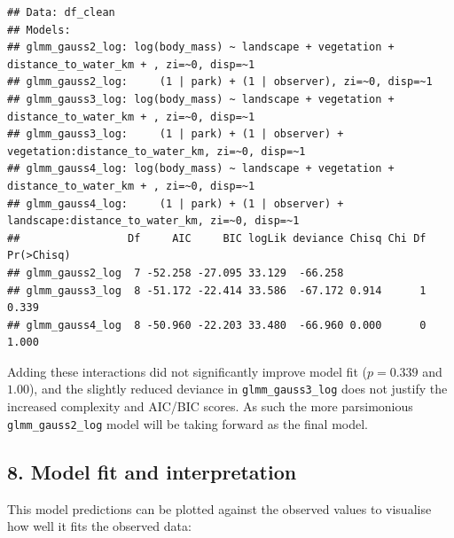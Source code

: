 \documentclass[
]{article}
\begin{document}
\begin{verbatim}
## Data: df_clean
## Models:
## glmm_gauss2_log: log(body_mass) ~ landscape + vegetation + distance_to_water_km + , zi=~0, disp=~1
## glmm_gauss2_log:     (1 | park) + (1 | observer), zi=~0, disp=~1
## glmm_gauss3_log: log(body_mass) ~ landscape + vegetation + distance_to_water_km + , zi=~0, disp=~1
## glmm_gauss3_log:     (1 | park) + (1 | observer) + vegetation:distance_to_water_km, zi=~0, disp=~1
## glmm_gauss4_log: log(body_mass) ~ landscape + vegetation + distance_to_water_km + , zi=~0, disp=~1
## glmm_gauss4_log:     (1 | park) + (1 | observer) + landscape:distance_to_water_km, zi=~0, disp=~1
##                 Df     AIC     BIC logLik deviance Chisq Chi Df Pr(>Chisq)
## glmm_gauss2_log  7 -52.258 -27.095 33.129  -66.258                        
## glmm_gauss3_log  8 -51.172 -22.414 33.586  -67.172 0.914      1      0.339
## glmm_gauss4_log  8 -50.960 -22.203 33.480  -66.960 0.000      0      1.000
\end{verbatim}

Adding these interactions did not significantly improve model fit
(\(p = 0.339\) and \(1.00\)), and the slightly reduced deviance in
\texttt{glmm\_gauss3\_log} does not justify the increased complexity and
AIC/BIC scores. As such the more parsimonious \texttt{glmm\_gauss2\_log}
model will be taking forward as the final model.

\subsection{8. Model fit and
interpretation}\label{model-fit-and-interpretation}

This model predictions can be plotted against the observed values to
visualise how well it fits the observed data:
\end{document}
